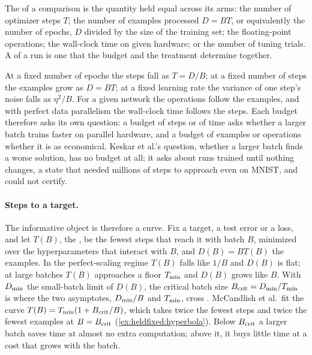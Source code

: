 \begin{refsection}
\begin{definition}\label{def:heldfixed:budget}
The  of a comparison is the quantity held equal across its arms: the number of optimizer steps $T$; the number of examples processed $D=BT$, or equivalently the number of epochs, $D$ divided by the size of the training set; the floating-point operations; the wall-clock time on given hardware; or the number of tuning trials. A  of a run is one that the budget and the treatment determine together.
\end{definition}

At a fixed number of epochs the steps fall as $T=D/B$; at a fixed number of steps the examples grow as $D=BT$; at a fixed learning rate the variance of one step's noise falls as $\eta^2/B$. For a given network the operations follow the examples, and with perfect data parallelism the wall-clock time follows the steps. Each budget therefore asks its own question: a budget of steps or of time asks whether a larger batch trains faster on parallel hardware, and a budget of examples or operations whether it is as economical. Keskar et al.'s question, whether a larger batch finds a worse solution, has no budget at all; it asks about runs trained until nothing changes, a state that \textcite{ShallueEtAl2019} needed millions of steps to approach even on MNIST, and could not certify.

\paragraph{Steps to a target.} The informative object is therefore a curve. Fix a target, a test error or a loss, and let $T(B)$, the , be the fewest steps that reach it with batch $B$, minimized over the hyperparameters that interact with $B$, and $D(B)=BT(B)$ the examples. In the perfect-scaling regime $T(B)$ falls like $1/B$ and $D(B)$ is flat; at large batches $T(B)$ approaches a floor $T_{\min}$ and $D(B)$ grows like $B$. With $D_{\min}$ the small-batch limit of $D(B)$, the critical batch size $B_{\mathrm{crit}}=D_{\min}/T_{\min}$ is where the two asymptotes, $D_{\min}/B$ and $T_{\min}$, cross \parencite{McCandlishEtAl2018}. McCandlish et al.\ fit the curve $T(B)=T_{\min}(1+B_{\mathrm{crit}}/B)$, which takes twice the fewest steps and twice the fewest examples at $B=B_{\mathrm{crit}}$ (\cref{ex:heldfixed:hyperbola}). Below $B_{\mathrm{crit}}$ a larger batch saves time at almost no extra computation; above it, it buys little time at a cost that grows with the batch.


\end{refsection}
